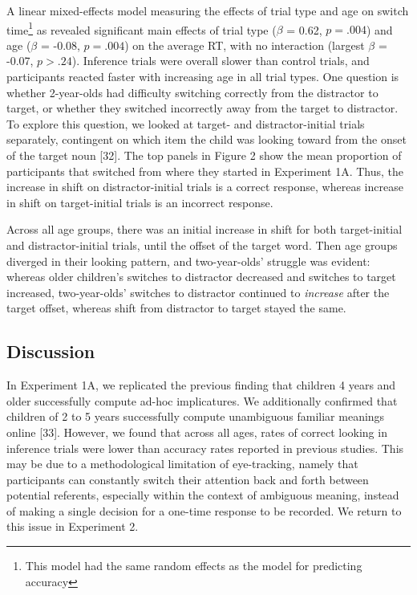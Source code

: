 \documentclass{rsos}
\begin{document}
A linear mixed-effects model measuring the effects of trial type and age
on switch time\footnote{This model had the same random effects as the
  model for predicting accuracy} as revealed significant main effects of
trial type (\(\beta\) = 0.62, \(p =.004\)) and age (\(\beta\) = -0.08,
\(p =.004\)) on the average RT, with no interaction (largest \(\beta\) =
-0.07, \(p >.24\)). Inference trials were overall slower than control
trials, and participants reacted faster with increasing age in all trial
types. One question is whether 2-year-olds had difficulty switching
correctly from the distractor to target, or whether they switched
incorrectly away from the target to distractor. To explore this
question, we looked at target- and distractor-initial trials separately,
contingent on which item the child was looking toward from the onset of
the target noun {[}32{]}. The top panels in Figure 2 show the mean
proportion of participants that switched from where they started in
Experiment 1A. Thus, the increase in shift on distractor-initial trials
is a correct response, whereas increase in shift on target-initial
trials is an incorrect response.

Across all age groups, there was an initial increase in shift for both
target-initial and distractor-initial trials, until the offset of the
target word. Then age groups diverged in their looking pattern, and
two-year-olds' struggle was evident: whereas older children's switches
to distractor decreased and switches to target increased, two-year-olds'
switches to distractor continued to \emph{increase} after the target
offset, whereas shift from distractor to target stayed the same.

\subsection{Discussion}\label{discussion}

In Experiment 1A, we replicated the previous finding that children 4
years and older successfully compute ad-hoc implicatures. We
additionally confirmed that children of 2 to 5 years successfully
compute unambiguous familiar meanings online {[}33{]}. However, we found
that across all ages, rates of correct looking in inference trials were
lower than accuracy rates reported in previous studies. This may be due
to a methodological limitation of eye-tracking, namely that participants
can constantly switch their attention back and forth between potential
referents, especially within the context of ambiguous meaning, instead
of making a single decision for a one-time response to be recorded. We
return to this issue in Experiment 2.
\end{document}
